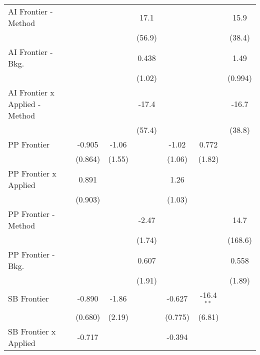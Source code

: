 \begin{tabular}{lcccccc}
   AI Frontier - Method           &              &         & 17.1          &              &              & 15.9\\   
                                  &              &         & (56.9)        &              &              & (38.4)\\   
   AI Frontier - Bkg.             &              &         & 0.438         &              &              & 1.49\\   
                                  &              &         & (1.02)        &              &              & (0.994)\\   
   AI Frontier x Applied - Method &              &         & -17.4         &              &              & -16.7\\   
                                  &              &         & (57.4)        &              &              & (38.8)\\   
   PP Frontier                    & -0.905       & -1.06   &               & -1.02        & 0.772        &   \\   
                                  & (0.864)      & (1.55)  &               & (1.06)       & (1.82)       &   \\   
   PP Frontier x Applied          & 0.891        &         &               & 1.26         &              &   \\   
                                  & (0.903)      &         &               & (1.03)       &              &   \\   
   PP Frontier - Method           &              &         & -2.47         &              &              & 14.7\\   
                                  &              &         & (1.74)        &              &              & (168.6)\\   
   PP Frontier - Bkg.             &              &         & 0.607         &              &              & 0.558\\   
                                  &              &         & (1.91)        &              &              & (1.89)\\   
   SB Frontier                    & -0.890       & -1.86   &               & -0.627       & -16.4$^{**}$ &   \\   
                                  & (0.680)      & (2.19)  &               & (0.775)      & (6.81)       &   \\   
   SB Frontier x Applied          & -0.717       &         &               & -0.394       &              &   \\   

\end{tabular}
